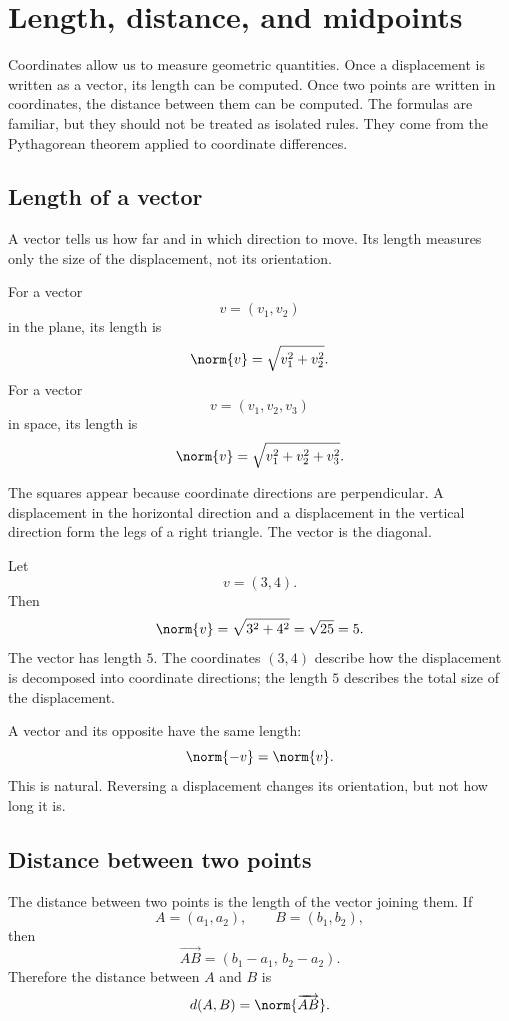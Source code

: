 \section{Length, distance, and midpoints}

Coordinates allow us to measure geometric quantities. Once a displacement is written as a vector, its length can be computed. Once two points are written in coordinates, the distance between them can be computed. The formulas are familiar, but they should not be treated as isolated rules. They come from the Pythagorean theorem applied to coordinate differences.

\subsection*{Length of a vector}

A vector tells us how far and in which direction to move. Its length measures only the size of the displacement, not its orientation.

\begin{definitionbox}
For a vector
\[
v=(v_1,v_2)
\]
in the plane, its length is
\[
\norm{v}=\sqrt{v_1^2+v_2^2}.
\]
For a vector
\[
v=(v_1,v_2,v_3)
\]
in space, its length is
\[
\norm{v}=\sqrt{v_1^2+v_2^2+v_3^2}.
\]
\end{definitionbox}

The squares appear because coordinate directions are perpendicular. A displacement in the horizontal direction and a displacement in the vertical direction form the legs of a right triangle. The vector is the diagonal.

\begin{examplebox}
Let
\[
v=(3,4).
\]
Then
\[
\norm{v}=\sqrt{3^2+4^2}=\sqrt{25}=5.
\]
The vector has length \(5\). The coordinates \((3,4)\) describe how the displacement is decomposed into coordinate directions; the length \(5\) describes the total size of the displacement.
\end{examplebox}

A vector and its opposite have the same length:
\[
\norm{-v}=\norm{v}.
\]
This is natural. Reversing a displacement changes its orientation, but not how long it is.

\subsection*{Distance between two points}

The distance between two points is the length of the vector joining them. If
\[
A=(a_1,a_2),
\qquad
B=(b_1,b_2),
\]
then
\[
\overrightarrow{AB}=(b_1-a_1,\,b_2-a_2).
\]
Therefore the distance between \(A\) and \(B\) is
\[
d(A,B)=\norm{\overrightarrow{AB}}.
\]

